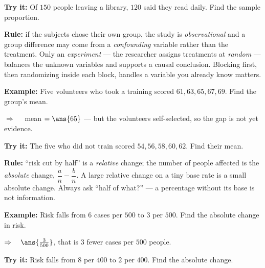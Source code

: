 \documentclass[12pt]{article}
\begin{document}
\begin{tryitbox}
\textbf{Try it:} \quad Of $150$ people leaving a library, $120$ said they read daily. Find the sample proportion.\\[2pt]
\end{tryitbox}


\begin{formulabox}
\textbf{Rule:} if the subjects chose their own group, the study is \emph{observational} and a
group difference may come from a \emph{confounding} variable rather than the treatment. Only an
\emph{experiment} --- the researcher assigns treatments at \emph{random} --- balances the
unknown variables and supports a causal conclusion. Blocking first, then randomizing inside
each block, handles a variable you already know matters.
\end{formulabox}

\begin{examplebox}
\textbf{Example:} \quad Five volunteers who took a training scored $61, 63, 65, 67, 69$. Find the group's mean.

$\Rightarrow\quad$ mean $= \ans{65}$ --- but the volunteers self-selected, so the gap is not yet evidence.
\end{examplebox}

\begin{tryitbox}
\textbf{Try it:} \quad The five who did not train scored $54, 56, 58, 60, 62$. Find their mean.\\[2pt]
\end{tryitbox}


\begin{formulabox}
\textbf{Rule:} ``risk cut by half'' is a \emph{relative} change; the number of people affected
is the \emph{absolute} change, $\dfrac{a}{n} - \dfrac{b}{n}$. A large relative change on a tiny
base rate is a small absolute change. Always ask ``half of what?'' --- a percentage without its
base is not information.
\end{formulabox}

\begin{examplebox}
\textbf{Example:} \quad Risk falls from $6$ cases per $500$ to $3$ per $500$. Find the absolute change in risk.

$\Rightarrow\quad \ans{\tfrac{3}{500}}$, that is $3$ fewer cases per $500$ people.
\end{examplebox}

\begin{tryitbox}
\textbf{Try it:} \quad Risk falls from $8$ per $400$ to $2$ per $400$. Find the absolute change.\\[2pt]
\end{tryitbox}
\end{document}

